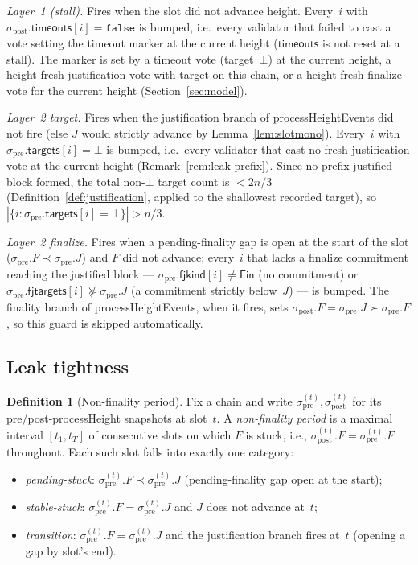 \ifx\litemode\undefined\documentclass{article}\fi
\newcommand{\targets}{\mathsf{targets}}
\newcommand{\timeouts}{\mathsf{timeouts}}
\newcommand{\fjtargets}{\mathsf{fjtargets}}
\newcommand{\fjkind}{\mathsf{fjkind}}
\newcommand{\kfin}{\mathsf{Fin}}
\newcommand{\processHeight}{\textsf{processHeight}\xspace}
\newcommand{\processHeightEvents}{\textsf{processHeightEvents}\xspace}
\theoremstyle{plain}
\theoremstyle{definition}
\newtheorem{definition}{Definition}
\theoremstyle{remark}
\begin{document}
\emph{Layer~1 (stall).} Fires when the slot did not advance height.
Every~$i$ with $\sigma_{\mathrm{post}}.\timeouts[i] = \mathtt{false}$ is bumped, i.e.\ every validator that failed to cast a vote setting the timeout marker at the current height ($\timeouts$ is not reset at a stall).
The marker is set by a timeout vote (target~$\bot$) at the current height, a height-fresh justification vote with target on this chain, or a height-fresh finalize vote for the current height (Section~\ref{sec:model}).

\emph{Layer~2 target.} Fires when the justification branch of \processHeightEvents did not fire (else $J$ would strictly advance by Lemma~\ref{lem:slotmono}).
Every~$i$ with $\sigma_{\mathrm{pre}}.\targets[i] = \bot$ is bumped, i.e.\ every validator that cast no fresh justification vote at the current height (Remark~\ref{rem:leak-prefix}).
Since no prefix-justified block formed, the total non-$\bot$ target count is $< 2n/3$ (Definition~\ref{def:justification}, applied to the shallowest recorded target), so $|\{i : \sigma_{\mathrm{pre}}.\targets[i] = \bot\}| > n/3$.

\emph{Layer~2 finalize.} Fires when a pending-finality gap is open at the start of the slot ($\sigma_{\mathrm{pre}}.F \prec \sigma_{\mathrm{pre}}.J$) and $F$ did not advance; every~$i$ that lacks a finalize commitment reaching the justified block --- $\sigma_{\mathrm{pre}}.\fjkind[i] \neq \kfin$ (no commitment) or $\sigma_{\mathrm{pre}}.\fjtargets[i] \not\succeq \sigma_{\mathrm{pre}}.J$ (a commitment strictly below~$J$) --- is bumped.
The finality branch of \processHeightEvents, when it fires, sets $\sigma_{\mathrm{post}}.F = \sigma_{\mathrm{pre}}.J \succ \sigma_{\mathrm{pre}}.F$, so this guard is skipped automatically.

\subsection{Leak tightness}

\begin{definition}[Non-finality period]\label{def:non-finality-period}
Fix a chain and write $\sigma_{\mathrm{pre}}^{(t)}, \sigma_{\mathrm{post}}^{(t)}$ for its pre/post-\processHeight snapshots at slot~$t$.
A \emph{non-finality period} is a maximal interval $[t_1, t_T]$ of consecutive slots on which $F$ is stuck, i.e., $\sigma_{\mathrm{post}}^{(t)}.F = \sigma_{\mathrm{pre}}^{(t)}.F$ throughout.
Each such slot falls into exactly one category:
\begin{itemize}
  \item \emph{pending-stuck}: $\sigma_{\mathrm{pre}}^{(t)}.F \prec \sigma_{\mathrm{pre}}^{(t)}.J$ (pending-finality gap open at the start);
  \item \emph{stable-stuck}: $\sigma_{\mathrm{pre}}^{(t)}.F = \sigma_{\mathrm{pre}}^{(t)}.J$ and $J$ does not advance at~$t$;
  \item \emph{transition}: $\sigma_{\mathrm{pre}}^{(t)}.F = \sigma_{\mathrm{pre}}^{(t)}.J$ and the justification branch fires at~$t$ (opening a gap by slot's end).
\end{itemize}
\end{definition}
\end{document}
